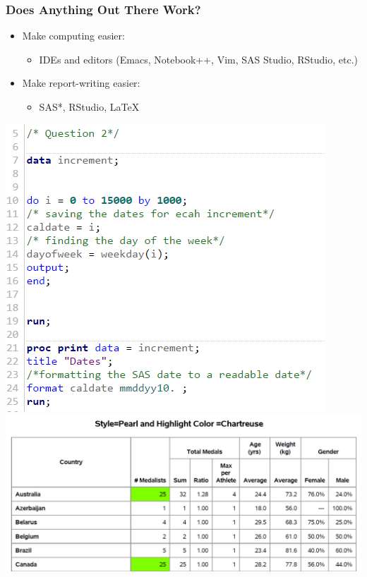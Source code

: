 \documentclass[xcolor={dvipsnames}]{beamer}
\newcommand{\ft}{\frametitle}
\newcommand{\bi}{\begin{itemize}}
\newcommand{\ei}{\end{itemize}}
\begin{document}
\begin{frame}
\ft{Does Anything Out There Work?}
\begin{minipage}{.45\textwidth}
\bi
	\item Make computing easier:
		\bi
			\item IDEs and editors (Emacs, Notebook++, Vim, SAS Studio, RStudio, etc.)
		\ei
	\item Make report-writing easier:
		\bi
			\item SAS*, RStudio, LaTeX
		\ei
\ei
\end{minipage}
\begin{minipage}{.45\textwidth}
\begin{center}
	\includegraphics[width = .75\textwidth]{SAS-StudioPic.PNG}
	\includegraphics[width = .75\textwidth]{PROC-REPORT-Pic.PNG}
\end{center}
\end{minipage}
\end{frame}
\end{document}

